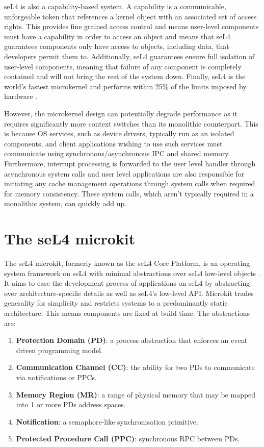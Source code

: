 seL4 is also a capability-based system. A capability is a communicable, unforgeable token that 
references a kernel object with an associated set of access rights. This provides fine grained access control
and means user-level components must have a capability in order to access an object and means that seL4
guarantees components only have access to objects, including data, that developers permit them to.
Additionally, seL4 guarantees ensure full isolation of user-level components, meaning that
failure of any component is completely contained and will not bring the rest of the system down. 
Finally, seL4 is the world's fastest microkernel and performs within 25\%
of the limits imposed by hardware \cite{Mi_LYWC_19}. 

However, the microkernel design can potentially degrade performance as it requires
significantly more context switches than its monolithic counterpart. This is because OS services,
such as device drivers, typically run as an isolated components, and client
applications wishing to use such services must communicate using synchronous/asynchronous
IPC and shared memory. Furthermore, interrupt processing is forwarded to the user level handler
through asynchronous system calls and user level applications are also responsible for initiating
any cache management operations through system calls when required
for memory consistency. These system calls, which aren't typically required in a monolithic
system, can quickly add up. 

\section{The seL4 microkit}
The seL4 microkit, formerly known as the seL4 Core Platform,
is an operating system framework on seL4 with minimal abstractions over seL4 low-level
objects \cite{Heiser_PCVL_22}. It aims to ease the development process of applications on seL4 by abstracting over
architecture-specific details as well as seL4's low-level API. Microkit trades generality for simplicity and 
restricts systems to a predominantly static architecture. This means components are fixed at build time. 
The abstractions are:
\begin{enumerate}
    \item \textbf{Protection Domain (PD)}: a process abstraction that enforces an event driven programming model.
    \item \textbf{Communication Channel (CC)}: the ability for two PDs to communicate via notifications or PPCs.
    \item \textbf{Memory Region (MR)}: a range of physical memory that may be mapped into 1 or more PDs address spaces. 
    \item \textbf{Notification}: a semaphore-like synchronisation primitive. 
    \item \textbf{Protected Procedure Call (PPC)}: synchronous RPC between PDs. 
\end{enumerate}

